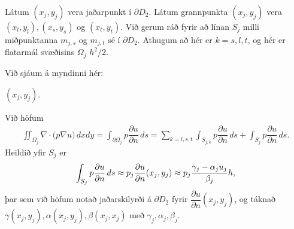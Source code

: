 \documentclass[a4paper,10pt,icelandic]{sphinxmanual}
\begin{document}
Látum \((x_j,y_j)\) vera jaðarpunkt í  \(\partial D_2\). Látum grannpunkta \((x_j, y_j)\) vera \((x_l,y_l), (x_s,y_s)\) og \((x_t,y_t)\).
Við gerum ráð fyrir að línan \(S_j\) milli miðpunktanna \(m_{j,s}\) og \(m_{j,t}\) sé í \(\partial D_2\).
Athugum að hér er \(k=s, l, t\), og hér er flatarmál svæðisins \(\Omega_j\) \(h^2/2\).

Við sjáum á myndinni hér:


  \((x_j,y_j)\).

Við höfum
\begin{equation*}
\begin{split}\iint_{\Omega_j} \nabla\cdot\big(p\nabla u\big) \, dxdy=
\int_{\partial \Omega_j} p\dfrac{\partial u}{\partial n}\, ds
=\sum_{k=l,s,t} \int_{S_{j,k}} p\dfrac{\partial u}{\partial n}\, ds
+\int_{S_{j}} p\dfrac{\partial u}{\partial n}\, ds.\end{split}
\end{equation*}
Heildið yfir \(S_j\) er
\begin{equation*}
\begin{split}\int_{S_{j}} p\dfrac{\partial u}{\partial n}\, ds \approx
p_j \dfrac{\partial u}{\partial n}(x_j,y_j) \approx p_j {\gamma_j-\alpha_j u_j\over \beta_j} h,\end{split}
\end{equation*}
þar sem við höfum notað jaðarskilyrði á \(\partial D_2\) fyrir \(\dfrac{\partial u}{\partial n}(x_j,y_j)\), og táknað \(\gamma(x_j,y_j), \alpha(x_j,y_j), \beta(x_j,x_j)\) með \(\gamma_j,\alpha_j, \beta_j\).
\end{document}

